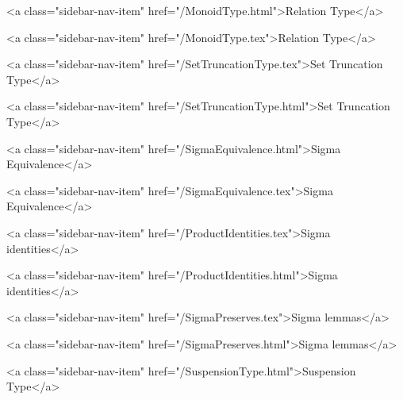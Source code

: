       
    
      
        
          <a class="sidebar-nav-item" href="/MonoidType.html">Relation Type</a>
        
      
    
      
        
          <a class="sidebar-nav-item" href="/MonoidType.tex">Relation Type</a>
        
      
    
      
        
          <a class="sidebar-nav-item" href="/SetTruncationType.tex">Set Truncation Type</a>
        
      
    
      
        
          <a class="sidebar-nav-item" href="/SetTruncationType.html">Set Truncation Type</a>
        
      
    
      
        
          <a class="sidebar-nav-item" href="/SigmaEquivalence.html">Sigma Equivalence</a>
        
      
    
      
        
          <a class="sidebar-nav-item" href="/SigmaEquivalence.tex">Sigma Equivalence</a>
        
      
    
      
        
          <a class="sidebar-nav-item" href="/ProductIdentities.tex">Sigma identities</a>
        
      
    
      
        
          <a class="sidebar-nav-item" href="/ProductIdentities.html">Sigma identities</a>
        
      
    
      
        
          <a class="sidebar-nav-item" href="/SigmaPreserves.tex">Sigma lemmas</a>
        
      
    
      
        
          <a class="sidebar-nav-item" href="/SigmaPreserves.html">Sigma lemmas</a>
        
      
    
      
        
          <a class="sidebar-nav-item" href="/SuspensionType.html">Suspension Type</a>
        
